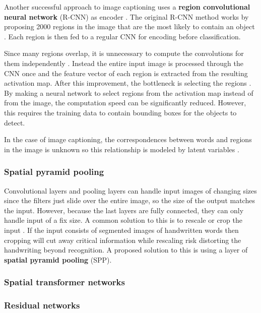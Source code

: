 
Another successful approach to image captioning uses a \textbf{region convolutional neural network} (R-CNN) as encoder \cite{VisualSemanticAlignment}.
The original R-CNN method works by proposing 2000 regions in the image that are the most likely to contain an object \cite{RCNN}. Each region is then fed to a regular CNN for encoding before classification.

Since many regions overlap, it is unnecessary to compute the convolutions for them independently \cite{FastRCNN}. Instead the entire input image is processed through the CNN once and the feature vector of each region is extracted from the resulting activation map. After this improvement, the bottleneck is selecting the regions \cite{FasterRCNN}. By making a neural network to select regions from the activation map instead of from the image, the computation speed can be significantly reduced. However, this requires the training data to contain bounding boxes for the objects to detect.

In the case of image captioning, the correspondences between words and regions in the image is unknown so this relationship is modeled by latent variables \cite{VisualSemanticAlignment}.

\subsubsection{Spatial pyramid pooling}

Convolutional layers and pooling layers can handle input images of changing sizes since the filters just slide over the entire image, so the size of the output matches the input.
However, because the last layers are fully connected, they can only handle input of a fix size. A common solution to this is to rescale or crop the input \cite{FornesCnnCategorization}. If the input consists of segmented images of handwritten words then cropping will cut away critical information while rescaling risk distorting the handwriting beyond recognition. A proposed solution to this is using a layer of \textbf{spatial pyramid pooling} (SPP).

\subsubsection{Spatial transformer networks}


\subsubsection{Residual networks}

